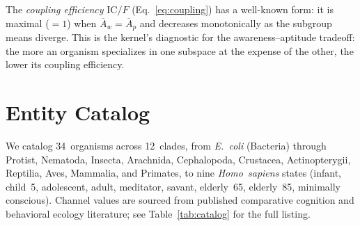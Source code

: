 \documentclass[
  aps,
  prd,
  twocolumn,
  superscriptaddress,
  nofootinbib,
  floatfix
]{revtex4-2}
\newcommand{\IC}{\mathrm{IC}}
\newcommand{\Aw}{\overline{A}_{\!w}}
\newcommand{\Ap}{\overline{A}_{\!p}}
\begin{document}
The \emph{coupling efficiency} $\IC/F$ (Eq.~\ref{eq:coupling})
has a well-known form: it is maximal ($= 1$) when
$\Aw = \Ap$ and decreases monotonically as the subgroup
means diverge.  This is the kernel's diagnostic for the
awareness--aptitude tradeoff: the more an organism
specializes in one subspace at the expense of the other,
the lower its coupling efficiency.

\section{Entity Catalog}\label{sec:catalog}

We catalog 34~organisms across 12~clades, from
\emph{E.~coli} (Bacteria) through Protist, Nematoda,
Insecta, Arachnida, Cephalopoda, Crustacea, Actinopterygii,
Reptilia, Aves, Mammalia, and Primates, to nine
\emph{Homo~sapiens} states (infant, child~5, adolescent,
adult, meditator, savant, elderly~65, elderly~85, minimally
conscious).  Channel values are sourced from published
comparative cognition and behavioral ecology literature;
see Table~\ref{tab:catalog} for the full listing.
\end{document}
